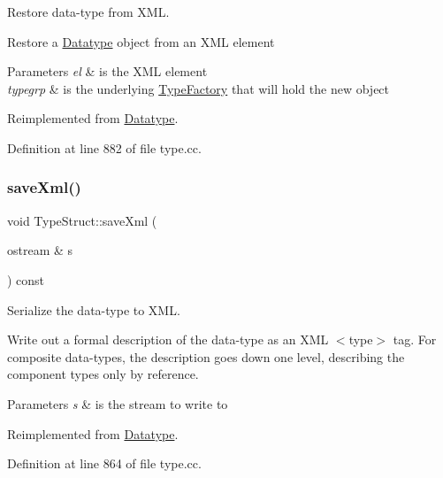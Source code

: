 Restore data-\/type from X\+ML. 

Restore a \mbox{\hyperlink{class_datatype}{Datatype}} object from an X\+ML element 
\begin{DoxyParams}{Parameters}
{\em el} & is the X\+ML element \\
\hline
{\em typegrp} & is the underlying \mbox{\hyperlink{class_type_factory}{Type\+Factory}} that will hold the new object \\
\hline
\end{DoxyParams}


Reimplemented from \mbox{\hyperlink{class_datatype_aed882ae693a31a64d56fffb9abdaa575}{Datatype}}.



Definition at line 882 of file type.\+cc.

\mbox{\label{class_type_struct_a5284d41a9de3664a4e08ed8649164873}} 
\subsubsection{\texorpdfstring{saveXml()}{saveXml()}}
{\footnotesize\ttfamily void Type\+Struct\+::save\+Xml (\begin{DoxyParamCaption}\item[{ostream \&}]{s }\end{DoxyParamCaption}) const\hspace{0.3cm}{\ttfamily [virtual]}}



Serialize the data-\/type to X\+ML. 

Write out a formal description of the data-\/type as an X\+ML $<$type$>$ tag. For composite data-\/types, the description goes down one level, describing the component types only by reference. 
\begin{DoxyParams}{Parameters}
{\em s} & is the stream to write to \\
\hline
\end{DoxyParams}


Reimplemented from \mbox{\hyperlink{class_datatype_a33339824f1c50d4354952296070c3902}{Datatype}}.



Definition at line 864 of file type.\+cc.

\mbox{\label{class_type_struct_abf9d27b301d027a5fad874b1f8c93b8c}} 
